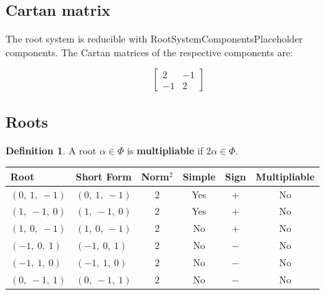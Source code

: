 \documentclass[11pt]{article}
\newcommand{\noi}{\noindent}
\newcommand{\tbf}{\textbf}
\theoremstyle{definition}
\newtheorem{definition}{Definition}[section]
\newif\ifrootsystemirreducible
\begin{document}
\begin{center}
\end{center}

\subsection{Cartan matrix}

\ifrootsystemirreducible
The root system is irreducible and has Cartan matrix:
\else
The root system is reducible with RootSystemComponentsPlaceholder components. The Cartan matrices of the respective components are:
\fi

\[
\left[\begin{matrix}2 & -1\\-1 & 2\end{matrix}\right]
\]

\subsection{Roots}

\begin{definition}
A root $\alpha \in \Phi$ is \tbf{multipliable} if $2\alpha \in \Phi$.
\end{definition}

\noi \begin{tabular}{|l|l|c|c|c|c|}
    \hline
    \textbf{Root} & \textbf{Short Form} & \textbf{Norm$^2$} & \textbf{Simple} & \textbf{Sign} & \textbf{Multipliable} \\
    \hline
    $\left( 0, \  1, \  -1\right)$ & $\left( 0, \  1, \  -1\right)$ & $2$ & Yes & $+$ & No \\
    \hline
    $\left( 1, \  -1, \  0\right)$ & $\left( 1, \  -1, \  0\right)$ & $2$ & Yes & $+$ & No \\
    \hline
    $\left( 1, \  0, \  -1\right)$ & $\left( 1, \  0, \  -1\right)$ & $2$ & No & $+$ & No \\
    \hline
    $\left( -1, \  0, \  1\right)$ & $\left( -1, \  0, \  1\right)$ & $2$ & No & $-$ & No \\
    \hline
    $\left( -1, \  1, \  0\right)$ & $\left( -1, \  1, \  0\right)$ & $2$ & No & $-$ & No \\
    \hline
    $\left( 0, \  -1, \  1\right)$ & $\left( 0, \  -1, \  1\right)$ & $2$ & No & $-$ & No \\
    \hline
\end{tabular}
\end{document}
